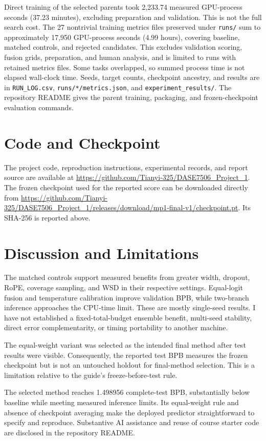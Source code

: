 \documentclass[10pt,a4paper]{article}
\begin{document}
Direct training of the selected parents took 2,233.74 measured GPU-process seconds (37.23 minutes), excluding preparation and validation. This is not the full search cost. The 27 nontrivial training metrics files preserved under \texttt{runs/} sum to approximately 17,950 GPU-process seconds (4.99 hours), covering baseline, matched controls, and rejected candidates. This excludes validation scoring, fusion grids, preparation, and human analysis, and is limited to runs with retained metrics files. Some tasks overlapped, so summed process time is not elapsed wall-clock time. Seeds, target counts, checkpoint ancestry, and results are in \texttt{RUN\_LOG.csv}, \texttt{runs/*/metrics.json}, and \texttt{experiment\_results/}. The repository README gives the parent training, packaging, and frozen-checkpoint evaluation commands.

\section{Code and Checkpoint}
The project code, reproduction instructions, experimental records, and report source are available at \url{https://github.com/Tianyi-325/DASE7506_Project_1}. The frozen checkpoint used for the reported score can be downloaded directly from \url{https://github.com/Tianyi-325/DASE7506_Project_1/releases/download/mp1-final-v1/checkpoint.pt}. Its SHA-256 is reported above.

\section{Discussion and Limitations}
The matched controls support measured benefits from greater width, dropout, RoPE, coverage sampling, and WSD in their respective settings. Equal-logit fusion and temperature calibration improve validation BPB, while two-branch inference approaches the CPU-time limit. These are mostly single-seed results. I have not established a fixed-total-budget ensemble benefit, multi-seed stability, direct error complementarity, or timing portability to another machine.

The equal-weight variant was selected as the intended final method after test results were visible. Consequently, the reported test BPB measures the frozen checkpoint but is not an untouched holdout for final-method selection. This is a limitation relative to the guide's freeze-before-test rule.

The selected method reaches 1.498956 complete-test BPB, substantially below baseline while meeting measured inference limits. Its equal-weight rule and absence of checkpoint averaging make the deployed predictor straightforward to specify and reproduce. Substantive AI assistance and reuse of course starter code are disclosed in the repository README.
\end{document}
